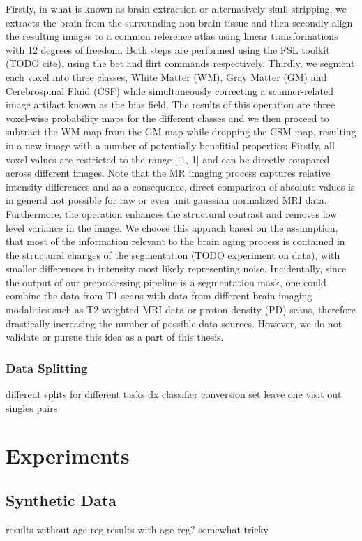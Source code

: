 Firstly, in what is known as brain extraction or alternatively skull stripping, we extracts the brain from the surrounding non-brain tissue and then secondly align the resulting images to a common reference atlas using linear transformations with 12 degrees of freedom. Both steps are performed using the FSL toolkit (TODO cite), using the bet and flirt commands respectively. Thirdly, we segment each voxel into three classes, White Matter (WM), Gray Matter (GM) and Cerebrospinal Fluid (CSF) while simultaneously correcting a scanner-related image artifact known as the bias field. The results of this operation are three voxel-wise probability maps for the different classes and we then proceed to subtract the WM map from the GM map while dropping the CSM map, resulting in a new image with a number of potentially benefitial properties: Firstly, all voxel values are restricted to the range [-1, 1] and can be directly compared across different images. Note that the MR imaging process captures relative intensity differences and as a consequence, direct comparison of absolute values is in general not possible for raw or even unit gaussian normalized MRI data. Furthermore, the operation enhances the structural contrast and removes low level variance in the image. We choose this apprach based on the assumption, that most of the information relevant to the brain aging process is contained in the structural changes of the segmentation (TODO experiment on data), with smaller differences in intensity most likely representing noise.
Incidentally, since the output of our preprocessing pipeline is a segmentation mask, one could combine the data from T1 scans with data from different brain imaging modalities such as T2-weighted MRI data or proton density (PD) scans, therefore drastically increasing the number of possible data sources. However, we do not validate or pursue this idea as a part of this thesis.

\subsection{Data Splitting}

different splits for different tasks
dx classifier
conversion set
leave one visit out
singles
pairs

\chapter{Experiments}

\section{Synthetic Data}
results without age reg
results with age reg? somewhat tricky

